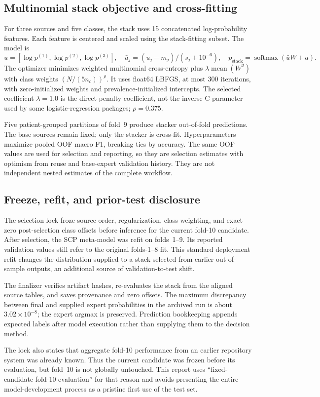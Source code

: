 \documentclass[11pt,a4paper]{article}
\begin{document}
\subsection{Multinomial stack objective and cross-fitting}
For three sources and five classes, the stack uses 15 concatenated log-probability features. Each feature is centered and scaled using the stack-fitting subset. The model is
\begin{equation}
u=[\log p^{(1)},\log p^{(2)},\log p^{(3)}],\quad
\bar u_j=(u_j-m_j)/(s_j+10^{-6}),\quad
p_{\mathrm{stack}}=\operatorname{softmax}(\bar uW+a).
\end{equation}
The optimizer minimizes weighted multinomial cross-entropy plus $\lambda\operatorname{mean}(W^2)$ with class weights $(N/(5n_c))^\rho$. It uses float64 LBFGS, at most 300 iterations, with zero-initialized weights and prevalence-initialized intercepts. The selected coefficient $\lambda=1.0$ is the direct penalty coefficient, not the inverse-C parameter used by some logistic-regression packages; $\rho=0.375$.

Five patient-grouped partitions of fold~9 produce stacker out-of-fold predictions. The base sources remain fixed; only the stacker is cross-fit. Hyperparameters maximize pooled OOF macro F1, breaking ties by accuracy. The same OOF values are used for selection and reporting, so they are selection estimates with optimism from reuse and base-expert validation history. They are not independent nested estimates of the complete workflow.

\subsection{Freeze, refit, and prior-test disclosure}
The selection lock froze source order, regularization, class weighting, and exact zero post-selection class offsets before inference for the current fold-10 candidate. After selection, the SCP meta-model was refit on folds~1--9. Its reported validation values still refer to the original folds-1--8 fit. This standard deployment refit changes the distribution supplied to a stack selected from earlier out-of-sample outputs, an additional source of validation-to-test shift.

The finalizer verifies artifact hashes, re-evaluates the stack from the aligned source tables, and saves provenance and zero offsets. The maximum discrepancy between final and supplied expert probabilities in the archived run is about $3.02\times10^{-8}$; the expert argmax is preserved. Prediction bookkeeping appends expected labels after model execution rather than supplying them to the decision method.

The lock also states that aggregate fold-10 performance from an earlier repository system was already known. Thus the current candidate was frozen before its evaluation, but fold~10 is not globally untouched. This report uses ``fixed-candidate fold-10 evaluation'' for that reason and avoids presenting the entire model-development process as a pristine first use of the test set.



\end{document}
